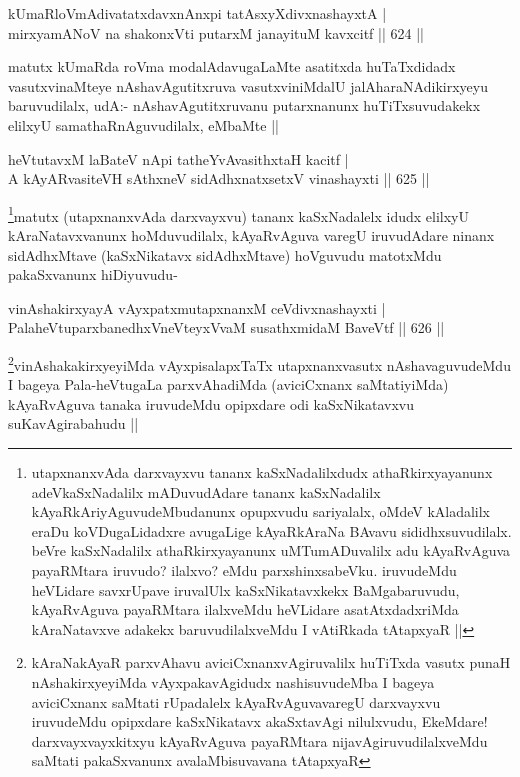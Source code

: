 
\begin{shl}
kUmaRloVmAdivatatxdavxnAnxpi tatAsxyXdivxnashayxtA | \\
mirxyamANoV na shakonxVti putarxM janayituM kavxcitf \hfill||  624 ||  
\end{shl}

\begin{artha}
matutx kUmaRda roVma modalAdavugaLaMte asatitxda huTaTxdidadx vasutxvinaMteye  nAshavAgutitxruva vasutxviniMdalU jalAharaNAdikirxyeyu baruvudilalx, udA:- nAshavAgutitxruvanu putarxnanunx huTiTxsuvudakekx elilxyU samathaRnAguvudilalx, eMbaMte ||
\end{artha}

\begin{shl}
heVtutavxM laBateV nApi tatheYvAvasithxtaH kacitf | \\
A kAyARvasiteVH sAthxneV sidAdhxnatxsetxV vinashayxti \hfill||  625 ||  
\end{shl}

\begin{artha}
\footnote{utapxnanxvAda darxvayxvu tananx kaSxNadalilxdudx athaRkirxyayanunx adeVkaSxNadalilx mADuvudAdare tananx kaSxNadalilx kAyaRkAriyAguvudeMbudanunx opupxvudu sariyalalx, oMdeV kAladalilx eraDu koVDugaLidadxre avugaLige kAyaRkAraNa BAvavu sididhxsuvudilalx. beVre kaSxNadalilx athaRkirxyayanunx uMTumADuvalilx adu kAyaRvAguva payaRMtara iruvudo? ilalxvo? eMdu parxshinxsabeVku. iruvudeMdu heVLidare savxrUpave iruvalUlx kaSxNikatavxkekx BaMgabaruvudu, kAyaRvAguva payaRMtara ilalxveMdu heVLidare asatAtxdadxriMda kAraNatavxve adakekx baruvudilalxveMdu I vAtiRkada tAtapxyaR ||}matutx (utapxnanxvAda darxvayxvu) tananx kaSxNadalelx idudx elilxyU kAraNatavxvanunx hoMduvudilalx, kAyaRvAguva varegU iruvudAdare ninanx sidAdhxMtave (kaSxNikatavx sidAdhxMtave) hoVguvudu matotxMdu pakaSxvanunx hiDiyuvudu-
\end{artha}

\begin{shl}
vinAshakirxyayA vAyxpatxmutapxnanxM ceVdivxnashayxti | \\
PalaheVtuparxbanedhxVneVteyxVvaM susathxmidaM BaveVtf \hfill||  626 ||  
\end{shl}

\begin{artha}
\footnote{kAraNakAyaR parxvAhavu aviciCxnanxvAgiruvalilx huTiTxda vasutx punaH nAshakirxyeyiMda vAyxpakavAgidudx nashisuvudeMba I bageya aviciCxnanx saMtati rUpadalelx kAyaRvAguvavaregU darxvayxvu iruvudeMdu opipxdare kaSxNikatavx akaSxtavAgi nilulxvudu, EkeMdare! darxvayxvayxkitxyu kAyaRvAguva payaRMtara nijavAgiruvudilalxveMdu saMtati pakaSxvanunx avalaMbisuvavana tAtapxyaR}vinAshakakirxyeyiMda vAyxpisalapxTaTx utapxnanxvasutx nAshavaguvudeMdu I bageya Pala-heVtugaLa parxvAhadiMda (aviciCxnanx saMtatiyiMda) kAyaRvAguva tanaka iruvudeMdu opipxdare odi kaSxNikatavxvu suKavAgirabahudu ||
\end{artha}

